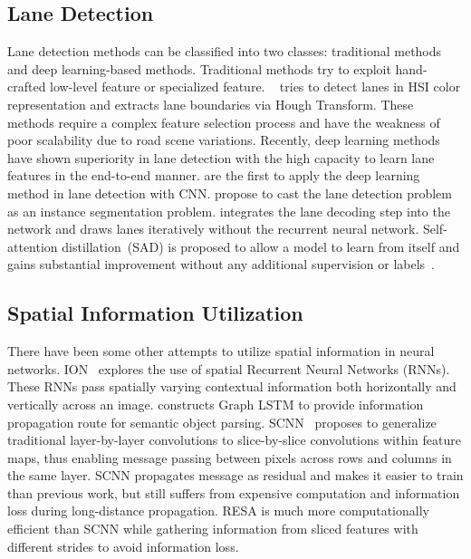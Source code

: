 \documentclass[letterpaper]{article} \usepackage{aaai21}  \usepackage{times}  \usepackage{helvet} \usepackage{courier}  \usepackage[hyphens]{url}  \usepackage{graphicx} \urlstyle{rm} \def\UrlFont{\rm}  \usepackage{natbib}  \usepackage{caption} \frenchspacing  \setlength{\pdfpagewidth}{8.5in}  \setlength{\pdfpageheight}{11in}  \usepackage{amsmath}
\begin{document}
\subsection{Lane Detection}
Lane detection methods can be classified into two classes: traditional methods and deep learning-based methods. Traditional methods try to exploit hand-crafted low-level feature or specialized feature. ~\citet{sun2006hsi} tries to detect lanes in HSI color representation and \citet{yu1997lane} extracts lane boundaries via Hough Transform. These methods require a complex feature selection process and have the weakness of poor scalability due to road scene variations. Recently, deep learning methods have shown superiority in lane detection with the high capacity to learn lane features in the end-to-end manner. \citet{huval2015empirical} are the first to apply the deep learning method in lane detection with CNN. \citet{neven2018towards} propose to cast the lane detection problem as an instance segmentation problem. \citet{philion2019fastdraw} integrates the lane decoding step into the network and draws lanes iteratively without the recurrent neural network. Self-attention distillation~(SAD) is proposed to allow a model to learn from itself and gains substantial improvement without any additional supervision or labels~\citep{hou2019learning}. 

\subsection{Spatial Information Utilization}
There have been some other attempts to utilize spatial information in neural networks.
ION~\citep{bell2016inside} explores the use of spatial Recurrent Neural Networks (RNNs). These RNNs pass spatially varying contextual information both horizontally and vertically across an image. \citet{liang2016semantic} constructs Graph LSTM to provide information propagation route for semantic object parsing. SCNN~\citep{pan2018spatial} proposes to generalize traditional layer-by-layer convolutions to slice-by-slice convolutions within feature maps, thus enabling message passing between pixels across rows and columns in the same layer. SCNN propagates message as residual and makes it easier to train than previous work, but still suffers from expensive computation and information loss during long-distance propagation. RESA is much more computationally efficient than SCNN while gathering information from sliced features with different strides to avoid information loss.
\end{document}
